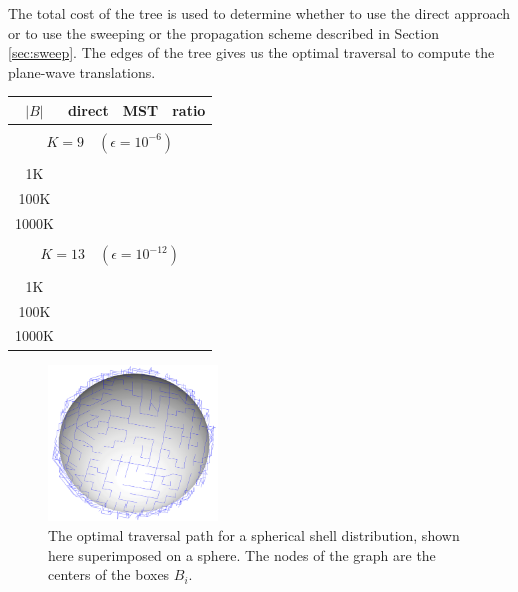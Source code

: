 The total cost of the tree is used to determine whether to use the direct approach or to use the sweeping or the propagation scheme described in Section \ref{sec:sweep}. The edges of the tree gives us the optimal traversal to compute the plane-wave translations.
\begin{table}
\centering
\begin{tabular}{cccc} \hline
        $|B|$  &  direct & MST & ratio \\ \hline       
        \multicolumn{4}{c}{}  \\
        \multicolumn{4}{c}{ {\small $K =  9 \quad (\epsilon = 10^{-6})$}}  \\
        \multicolumn{4}{c}{}  \\
         1K & & &  \\  
        100K & & &  \\  
       1000K & & &  \\  
       \multicolumn{4}{c}{}  \\
       \multicolumn{4}{c}{ {\small $K =  13 \quad (\epsilon = 10^{-12})$}}  \\
       \multicolumn{4}{c}{}  \\
             1K & & &  \\  
        100K & & &  \\  
       1000K & & &  \\  
\hline
\end{tabular}
\end{table}


\begin{figure}
\centering 	
\includegraphics[width=0.4\textwidth]{figs/sphere_mst}
\caption{The optimal traversal path for a spherical shell distribution, shown here superimposed on a sphere. The nodes of the graph are the centers of the boxes $B_i$.}
\end{figure}

